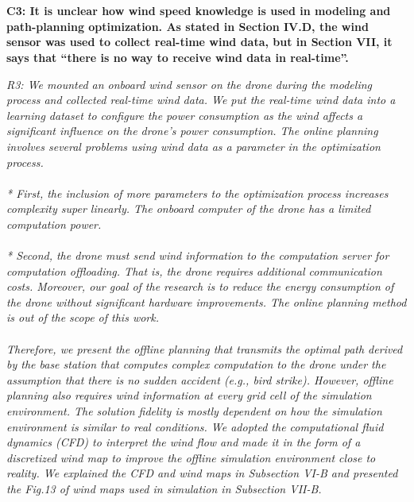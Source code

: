 \documentclass[onecolumn]{IEEEconf}
\begin{document}
\begin{description}
\begin{mdframed} [ linewidth=.75pt, userdefinedwidth=0.9\textwidth]
{\begin{tabular}{|c|c|c|c|c|c|}
    \end{tabular}
    }
    \end{mdframed} 
    ~\\	
    ~\\
    \item \textbf
    {
	C3: It is unclear how wind speed knowledge is used in modeling and path-planning optimization. As stated in Section IV.D, the wind sensor was used to collect real-time wind data, but in Section VII, it says that “there is no way to receive wind data in real-time”. 
	}
	\item \textit
	{
	R3: We mounted an onboard wind sensor on the drone during the modeling process and collected real-time wind data. We put the real-time wind data into a learning dataset to configure the power consumption as the wind affects a significant influence on the drone's power consumption. The online planning involves several problems using wind data as a parameter in the optimization process. 
    ~\\~\\
    * First, the inclusion of more parameters to the optimization process increases complexity super linearly. The onboard computer of the drone has a limited computation power.~\\~\\ 
    * Second, the drone must send wind information to the computation server for computation offloading. That is, the drone requires additional communication costs. Moreover, our goal of the research is to reduce the energy consumption of the drone without significant hardware improvements. The online planning method is out of the scope of this work. 
    ~\\~\\
    Therefore, we present the offline planning that transmits the optimal path derived by the base station that computes complex computation to the drone under the assumption that there is no sudden accident (e.g., bird strike). However, offline planning also requires wind information at every grid cell of the simulation environment. The solution fidelity is mostly dependent on how the simulation environment is similar to real conditions. 
    We adopted the computational fluid dynamics (CFD) to interpret the wind flow and made it in the form of a discretized wind map to improve the offline simulation environment close to reality. 
    We explained the CFD and wind maps in Subsection VI-B and presented the Fig.13 of wind maps used in simulation in Subsection VII-B.
	}
	~\\

\end{description}
\end{document}
